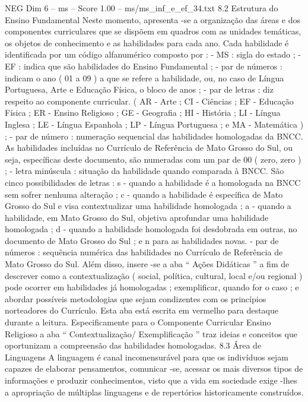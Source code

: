 \begin{textsample}{NEG Dim 6 – ms – Score 1.00 – ms/ms\_inf\_e\_ef\_34.txt}  \label{ex:f6_neg_240}
8.2 Estrutura do Ensino Fundamental Neste momento, apresenta -se a organização das áreas e dos componentes curriculares que se dispõem em quadros com as unidades temáticas, os objetos de conhecimento e as habilidades para cada ano.
Cada habilidade é identificada por um código alfanumérico composto por : - MS : sigla do estado ; - EF : indica que são habilidades do Ensino Fundamental ; - par de números : indicam o ano ( 01 a 09 ) a que se refere a habilidade, ou, no caso de Língua Portuguesa, Arte e Educação Física, o bloco de anos ; - par de letras : diz respeito ao componente curricular. ( AR - Arte ; CI - Ciências ; EF - Educação Física ; ER - Ensino Religioso ; GE - Geografia ; HI - História ; LI - Língua Inglesa ; LE - Língua Espanhola ; LP - Língua Portuguesa ; e MA - Matemática ) ; - par de número : numeração sequencial das habilidades homologadas da BNCC.
As habilidades incluídas no Currículo de Referência de Mato Grosso do Sul, ou seja, específicas deste documento, são numeradas com um par de 00 ( zero, zero ) ; - letra minúscula : situação da habilidade quando comparada à BNCC.
São cinco possibilidades de letras : s - quando a habilidade é a homologada na BNCC sem sofrer nenhuma alteração ; c - quando a habilidade é específica de Mato Grosso do Sul e visa contextualizar uma habilidade homologada ; a - quando a habilidade, em Mato Grosso do Sul, objetiva aprofundar uma habilidade homologada ; d - quando a habilidade homologada foi desdobrada em outras, no documento de Mato Grosso do Sul ; e n para as habilidades novas. - par de números : sequência numérica das habilidades no Currículo de Referência de Mato Grosso do Sul.
Além disso, insere -se a aba “ Ações Didáticas ” a fim de descrever como a contextualização ( social, política, cultural, local e/ou regional ) pode ocorrer em habilidades já homologadas ; exemplificar, quando for o caso ; e abordar possíveis metodologias que sejam condizentes com os princípios norteadores do Currículo.
Esta aba está escrita em vermelho para destaque durante a leitura.
Especificamente para o Componente Curricular Ensino Religioso a aba “ Contextualização/ Exemplificação ” traz ideias e conceitos que oportunizam a compreensão das habilidades homologadas. 8.3 Área de Linguagens A linguagem é canal incomensurável para que os indivíduos sejam capazes de elaborar pensamentos, comunicar -se, acessar os mais diversos tipos de informações e produzir conhecimentos, visto que a vida em sociedade exige -lhes a apropriação de múltiplas linguagens e de repertórios historicamente construídos.

\end{textsample}
